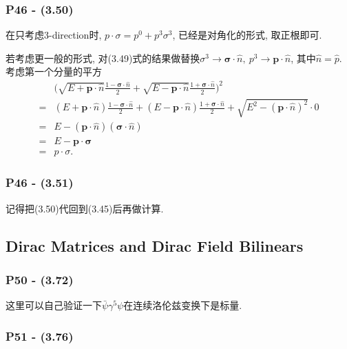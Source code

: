 \documentclass[cn,hazy,blue,11pt,device=normal,chinesefont=founder]{elegantnote}
\begin{document}
\subsubsection{P46 - (3.50)}

在只考虑3-direction时, $p\cdot \sigma = p^0 + p^3\sigma^3$, 已经是对角化的形式, 取正根即可. 

若考虑更一般的形式, 对(3.49)式的结果做替换$\sigma^3 \rightarrow \boldsymbol{\sigma}\cdot\hat{n},\ p^3 \rightarrow \mathbf{p}\cdot\hat{n}$, 其中$\hat{n} = \hat{p}$. 考虑第一个分量的平方
\begin{equation}
  \begin{aligned}
    &\biggl(\sqrt{E+\mathbf{p}\cdot\hat{n}} \frac{1-\boldsymbol{\sigma}\cdot\hat{n}}{2} + \sqrt{E-\mathbf{p}\cdot\hat{n}} \frac{1+\boldsymbol{\sigma}\cdot\hat{n}}{2} \biggr)^2 \\ 
    =& (E+\mathbf{p}\cdot\hat{n}) \frac{1-\boldsymbol{\sigma}\cdot\hat{n}}{2} + (E-\mathbf{p}\cdot\hat{n}) \frac{1+\boldsymbol{\sigma}\cdot\hat{n}}{2} + \sqrt{E^2 - (\mathbf{p}\cdot\hat{n})^2} \cdot 0 \\
    =& E - (\mathbf{p}\cdot\hat{n})(\boldsymbol{\sigma}\cdot\hat{n}) \\
    =& E - \mathbf{p} \cdot \boldsymbol{\sigma} \\
    =& p \cdot \sigma .
  \end{aligned}
\end{equation}

\subsubsection{P46 - (3.51)}

记得把(3.50)代回到(3.45)后再做计算. 

\subsection{Dirac Matrices and Dirac Field Bilinears}

\subsubsection{P50 - (3.72)}
\begin{remark}
  这里可以自己验证一下$\bar{\psi} \gamma^5 \psi$在连续洛伦兹变换下是标量.
\end{remark}

\subsubsection{P51 - (3.76)}
\end{document}

